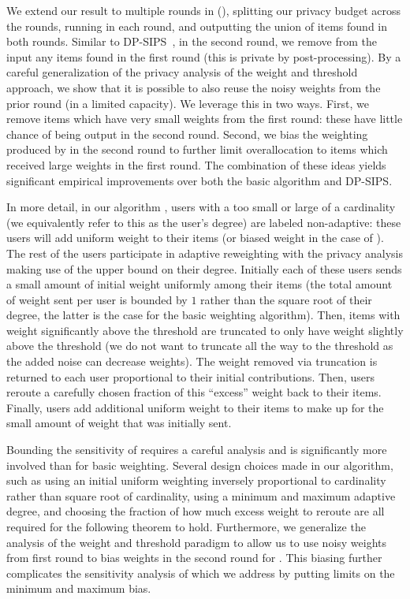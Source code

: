 We extend our result to multiple rounds in \ouralgotworoundslong{} (\ouralgotworounds{}), splitting our privacy budget across the rounds, running \ouralgo{} in each round, and outputting the union of items found in both rounds.
Similar to DP-SIPS~\cite{swanberg2023dpsips}, in the second round, we remove from the input any items found in the first round (this is private by post-processing).
By a careful generalization of the privacy analysis of the weight and threshold approach, we show that it is possible to also reuse the noisy weights from the prior round (in a limited capacity).
We leverage this in two ways. First, we remove items which have very small weights from the first round: these have little chance of being output in the second round. Second, we bias the weighting produced by \ouralgo{} in the second round to further limit overallocation to items which received large weights in the first round. The combination of these ideas yields significant empirical improvements over both the basic algorithm and DP-SIPS.

In more detail, in our algorithm \ouralgo{}, users with a too small or large of a cardinality (we equivalently refer to this as the user's degree) are labeled non-adaptive: these users will add uniform weight to their items (or biased weight in the case of \ouralgotworounds{}). 
The rest of the users participate in adaptive reweighting with the privacy analysis making use of the upper bound on their degree. Initially each of these users sends a small amount of initial weight uniformly among their items (the total amount of weight sent per user is bounded by $1$ rather than the square root of their degree, the latter is the case for the basic weighting algorithm). Then, items with weight significantly above the threshold are truncated to only have weight slightly above the threshold (we do not want to truncate all the way to the threshold as the added noise can decrease weights). The weight removed via truncation is returned to each user proportional to their initial contributions. Then, users reroute a carefully chosen fraction of this ``excess'' weight back to their items. Finally, users add additional uniform weight to their items to make up for the small amount of weight that was initially sent.

Bounding the sensitivity of \ouralgo{} requires a careful analysis and is significantly more involved than for basic weighting. Several design choices made in our algorithm, such as using an initial uniform weighting inversely proportional to cardinality rather than square root of cardinality, using a minimum and maximum adaptive degree, and choosing the fraction of how much excess weight to reroute are all required for the following theorem to hold. 
Furthermore, we generalize the analysis of the weight and threshold paradigm to allow us to use noisy weights from first round to bias weights in the second round for \ouralgotworounds{}.
This biasing further complicates the sensitivity analysis of \ouralgo{} which we address by putting limits on the minimum and maximum bias.


